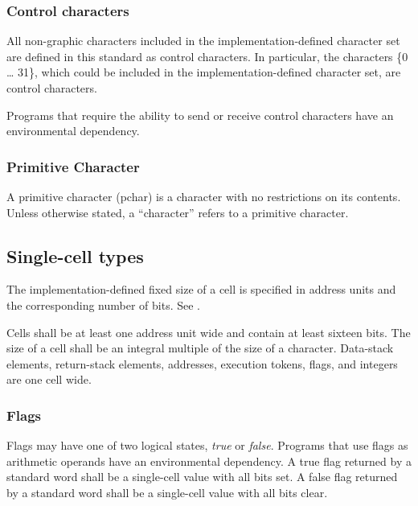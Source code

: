 \subsubsection{Control characters} %
\label{usage:control}

All non-graphic characters included in the implementation-defined
character set are defined in this standard as control characters.
In particular, the characters \{0 {\ldots} 31\}, which could be
included in the im\-ple\-ment\-ation-de\-fined character set, are control
characters.

Programs that require the ability to send or receive control
characters have an environmental dependency.

\subsubsection{Primitive Character} %
\label{usage:pchar}

A primitive character (pchar) is a character with no restrictions on
its contents.  Unless otherwise stated, a ``character'' refers to a
primitive character.

\subsection{Single-cell types} %
\label{usage:cell}

The implementation-defined fixed size of a cell is specified in
address units and the corresponding number of bits.
See .

Cells shall be at least one address unit wide and contain at least
sixteen bits. The size of a cell shall be an integral multiple of
the size of a character. Data-stack elements, return-stack elements,
addresses, execution tokens, flags, and integers are one cell wide.

\subsubsection{Flags} %
\label{usage:flags}

Flags may have one of two logical states, \emph{true} or \emph{false}.
Programs that use flags as arithmetic operands have an environmental
dependency. A true flag returned by a standard word shall be a
single-cell value with all bits set. A false flag returned by a
standard word shall be a single-cell value with all bits clear.

